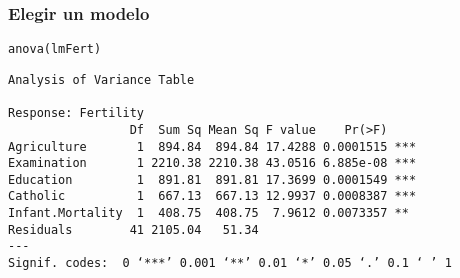 \documentclass[bigger]{beamer}
\begin{document}
\begin{frame}[fragile]
\frametitle{Elegir un modelo}
\label{sec-3-10}


\lstset{language=R}
\begin{lstlisting}
anova(lmFert)
\end{lstlisting}


\begin{verbatim}
Analysis of Variance Table

Response: Fertility
                 Df  Sum Sq Mean Sq F value    Pr(>F)    
Agriculture       1  894.84  894.84 17.4288 0.0001515 ***
Examination       1 2210.38 2210.38 43.0516 6.885e-08 ***
Education         1  891.81  891.81 17.3699 0.0001549 ***
Catholic          1  667.13  667.13 12.9937 0.0008387 ***
Infant.Mortality  1  408.75  408.75  7.9612 0.0073357 ** 
Residuals        41 2105.04   51.34                      
---
Signif. codes:  0 ‘***’ 0.001 ‘**’ 0.01 ‘*’ 0.05 ‘.’ 0.1 ‘ ’ 1
\end{verbatim}
\end{frame}
\end{document}
